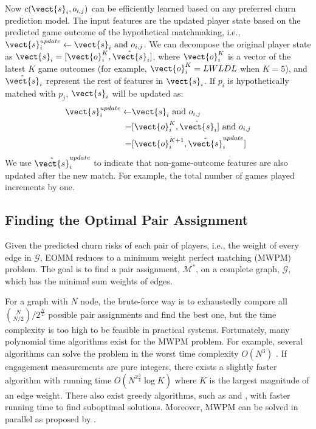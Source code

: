 Now $c(\vect{s}_i, o_{i,j})$ can be efficiently learned based on any preferred churn prediction model. The input features are the updated player state based on the predicted game outcome of the hypothetical matchmaking, i.e., $\vect{s}_i^{update} \leftarrow \vect{s}_i \text{ and } o_{i,j}$. We can decompose the original player state as $\vect{s}_i = [\vect{o}_i^K, \hat{\vect{s}}_i]$, where $\vect{o}_i^K$ is a vector of the latest $K$ game outcomes (for example, $\vect{o}_i^K=LWLDL$ when $K=5$), and $\hat{\vect{s}}_i$ represent the rest of features in $\vect{s}_i$. If $p_i$ is hypothetically matched with $p_j$, $\vect{s}_i$ will be updated as:
\begin{align}\label{eqn:stateUpdate}
\vect{s}_i^{update} \leftarrow& \vect{s}_i \text{ and } o_{i,j} \\
                    =& [\vect{o}_i^K, \hat{\vect{s}}_i] \text{ and } o_{i,j} \\
                    =& [\vect{o}_i^{K+1}, \hat{\vect{s}}_i^{update}]
\end{align}
We use $\hat{\vect{s}}_i^{update}$ to indicate that non-game-outcome features are also updated after the new match. For example, the total number of games played increments by one. 


\vspace{2mm}

\subsection{Finding the Optimal Pair Assignment}
Given the predicted churn risks of each pair of players, i.e., the weight of every edge in $\mathcal{G}$, EOMM reduces to a minimum weight perfect matching (MWPM) problem. The goal is to find a pair assignment, $\mathcal{M}^*$, on a complete graph, $\mathcal{G}$, which has the minimal sum weights of edges.

For a graph with $N$ node, the brute-force way is to exhaustedly compare all $\binom N{N/2} / 2^{\frac{N}{2}}$ possible pair assignments and find the best one, but the time complexity is too high to be feasible in practical systems. Fortunately, many polynomial time algorithms exist for the MWPM problem. For example, several algorithms can solve the problem in the worst time complexity $O(N^3)$ \cite{gabow1974implementation,lawler2001combinatorial}. If engagement measurements are pure integers, there exists a slightly faster algorithm \cite{gabow1985scaling} with running time $O(N^{2\frac{3}{4}}\log K)$ where $K$ is the largest magnitude of an edge weight. There also exist greedy algorithms, such as \cite{drake2003simple} and \cite{duan2014linear}, with faster running time to find suboptimal solutions. Moreover, MWPM can be solved in parallel as proposed by \cite{osiakwan1990maximum}.


